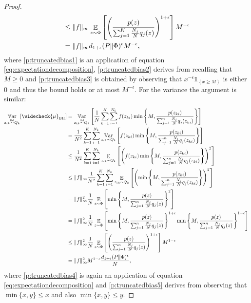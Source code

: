 \begin{proof}
\begin{align}
    & \le \|f\|_{\infty} \mathop{\mathbb{E}}_{z \sim \Phi} \left[  \left(  \frac{p(z)}{\sum_{j=1}^K \frac{N_j}{N} q_j(z)} \right)^{1+\epsilon} \right] M^{-\epsilon} \label{p:truncatedbias3}\\
        & = \|f\|_{\infty} d_{1+\epsilon}(P \| \Phi)^{\epsilon}  M^{-\epsilon},\notag
    \end{align}
    where \eqref{p:truncatedbias1} is an application of equation \eqref{eq:expectationdecomposition}, \eqref{p:truncatedbias2} derives from recalling that $M\ge 0$ and \eqref{p:truncatedbias3} is obtained by observing that $ x^{-\epsilon} \mathds{1}_{\left\{ x \ge M \right\} }$ is either $0$ and thus the bound holds or at most $M^{-\epsilon}$.
    For the variance the argument is similar:
    \begin{align}
    \Var_{z_{ik} \simiid Q_k} [\widecheck{\mu}_{\text{BH}}]&  = \Var_{z_{ik} \simiid Q_k} \left[ \frac{1}{N} \sum_{k=1}^K \sum_{i=1}^{N_k}  f(z_{ki}) \min \left\{ M, \frac{p(z_{ki})}{\sum_{j=1}^n \frac{N_j}{N} q_j(z_{ki})} \right\} \right] \notag\\
    & = \frac{1}{N^2} \sum_{k=1}^K \sum_{i=1}^{N_k} \Var_{z_{ik} \sim Q_k} \left[   f(z_{ki}) \min \left\{ M, \frac{p(z_{ki})}{\sum_{j=1}^n \frac{N_j}{N} q_j(z_{ki})} \right\} \right] \notag\\
    & \le \frac{1}{N^2} \sum_{k=1}^K \sum_{i=1}^{N_k} \Exp_{z_{ik} \sim Q_k} \left[   \left( f(z_{ki})  \min \left\{ M, \frac{p(z_{ki})}{\sum_{j=1}^n \frac{N_j}{N} q_j(z_{ki})} \right\} \right)^2 \right]\notag\\
    & \le \|f\|_{\infty} \frac{1}{N^2} \sum_{k=1}^K \sum_{i=1}^{N_k} \Exp_{z_{ik} \sim Q_k} \left[   \left( \min \left\{ M, \frac{p(z_{ki})}{\sum_{j=1}^n \frac{N_j}{N} q_j(z_{ki})} \right\} \right)^2 \right]\notag\\
    & = \|f\|_{\infty}^2 \frac{1}{N} \Exp_{z \sim \Phi} \left[ \min \left\{ M, \frac{p(z)}{\sum_{j=1}^n \frac{N_j}{N} q_j(z)} \right\}^2 \right] \label{p:truncatedbias4}\\
    & = \|f\|_{\infty}^2 \frac{1}{N} \Exp_{z \sim \Phi} \left[ \min \left\{ M, \frac{p(z)}{\sum_{j=1}^n \frac{N_j}{N} q_j(z)} \right\}^{1+\epsilon} \min \left\{ M, \frac{p(z)}{\sum_{j=1}^n \frac{N_j}{N} q_j(z)} \right\}^{1-\epsilon}  \right]\notag\\
    & \le \|f\|_{\infty}^2 \frac{1}{N} \Exp_{z \sim \Phi} \left[ \left( \frac{p(z)}{\sum_{j=1}^n \frac{N_j}{N} q_j(z)} \right)^{1+\epsilon}  \right] M^{1-\epsilon} \label{p:truncatedbias5}\\
    &= \|f\|_{\infty}^2 M^{1-\epsilon} \frac{d_{1+\epsilon}(P\|\Phi)^{\epsilon}}{N} ,\notag\\
    \end{align}
    where \eqref{p:truncatedbias4}  is again an application of equation \eqref{eq:expectationdecomposition} and \ref{p:truncatedbias5} derives from observing that $\min\{x,y\} \le x$ and also $\min\{x,y\} \le y$.
\end{proof}

